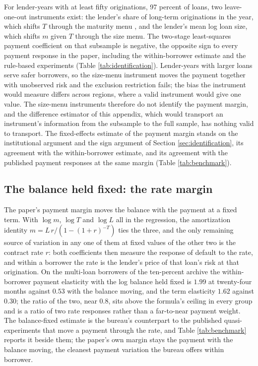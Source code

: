For lender-years with at least fifty originations, 97 percent of loans, two leave-one-out instruments exist: the lender's share of long-term originations in the year, which shifts $T$ through the maturity menu \citep{argyle_monthly_2020, hertzberg_screening_2018}, and the lender's mean log loan size, which shifts $m$ given $T$ through the size menu. The two-stage least-squares payment coefficient on that subsample is negative, the opposite sign to every payment response in the paper, including the within-borrower estimate and the rule-based experiments (Table \ref{tab:identification}). Lender-years with larger loans serve safer borrowers, so the size-menu instrument moves the payment together with unobserved risk and the exclusion restriction fails; the bias the instrument would measure differs across regions, where a valid instrument would give one value. The size-menu instruments therefore do not identify the payment margin, and the difference estimator of this appendix, which would transport an instrument's information from the subsample to the full sample, has nothing valid to transport. The fixed-effects estimate of the payment margin stands on the institutional argument and the sign argument of Section \ref{sec:identification}, its agreement with the within-borrower estimate, and its agreement with the published payment responses at the same margin (Table \ref{tab:benchmark}).

\subsection{The balance held fixed: the rate margin}\label{appendix:ratemargin}

The paper's payment margin moves the balance with the payment at a fixed term. With $\log m$, $\log T$ and $\log L$ all in the regression, the amortization identity $m = L\,r/(1 - (1+r)^{-T})$ ties the three, and the only remaining source of variation in any one of them at fixed values of the other two is the contract rate $r$: both coefficients then measure the response of default to the rate, and within a borrower the rate is the lender's price of that loan's risk at that origination. On the multi-loan borrowers of the ten-percent archive the within-borrower payment elasticity with the log balance held fixed is $1.99$ at twenty-four months against $0.53$ with the balance moving, and the term elasticity $1.62$ against $0.30$; the ratio of the two, near $0.8$, sits above the formula's ceiling in every group and is a ratio of two rate responses rather than a far-to-near payment weight. The balance-fixed estimate is the bureau's counterpart to the published quasi-experiments that move a payment through the rate, and Table \ref{tab:benchmark} reports it beside them; the paper's own margin stays the payment with the balance moving, the cleanest payment variation the bureau offers within borrower.

